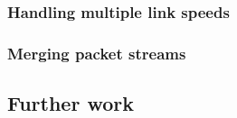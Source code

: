 				\subsubsection{Handling multiple link speeds}
					
				
				\subsubsection{Merging packet streams}
					
			
			\subsection{Further work}
				
	
